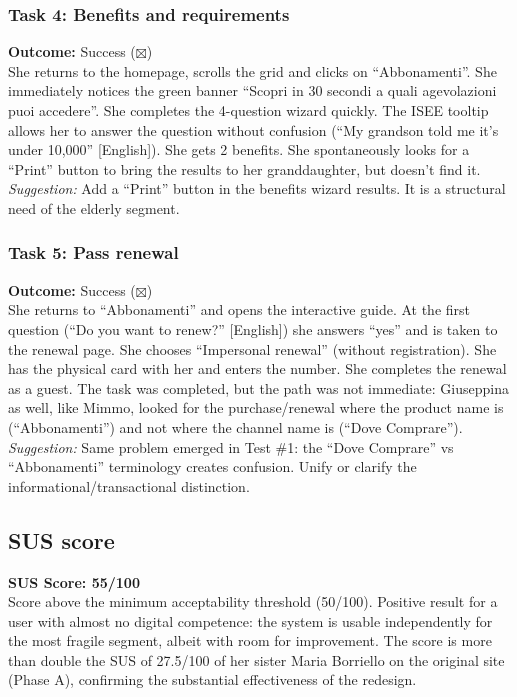 ﻿\documentclass[11pt,a4paper]{article}
\begin{document}
\begin{tcolorbox}[base]
\vspace{0.3cm}

\subsubsection*{Task 4: Benefits and requirements}
\noindent\textbf{Outcome:} Success ($\boxtimes$)\\[0.2cm]
She returns to the homepage, scrolls the grid and clicks on
``Abbonamenti''. She immediately notices the green banner
``Scopri in 30 secondi a quali agevolazioni puoi accedere''.
She completes the 4-question wizard quickly. The ISEE
tooltip allows her to answer the question without
confusion (``My grandson told me it's under 10,000'' [English]).
She gets 2 benefits. She spontaneously looks for a
``Print'' button to bring the results to her granddaughter, but doesn't
find it.\\[0.2cm]
\textit{Suggestion:} Add a ``Print'' button in the
benefits wizard results. It is a structural need
of the elderly segment.

\vspace{0.3cm}

\subsubsection*{Task 5: Pass renewal}
\noindent\textbf{Outcome:} Success ($\boxtimes$)\\[0.2cm]
She returns to ``Abbonamenti'' and opens the interactive guide. At the
first question (``Do you want to renew?'' [English]) she answers ``yes'' and is
taken to the renewal page. She chooses ``Impersonal
renewal'' (without registration). She has the physical card
with her and enters the number. She completes the renewal as a
guest. The task was completed, but the path
was not immediate: Giuseppina as well, like Mimmo,
looked for the purchase/renewal where the product name is
(``Abbonamenti'') and not where the channel name is
(``Dove Comprare'').\\[0.2cm]
\textit{Suggestion:} Same problem emerged in Test \#1:
the ``Dove Comprare'' vs ``Abbonamenti'' terminology creates
confusion. Unify or clarify the informational/transactional
distinction.

\end{tcolorbox}

\subsection*{SUS score}
\begin{tcolorbox}[base]
\textbf{SUS Score: 55/100}\\[0.2cm]
\small Score above the minimum acceptability threshold
(50/100). Positive result for a user
with almost no digital competence: the system is usable
independently for the most fragile segment, albeit with room
for improvement. The score is more than double the
SUS of 27.5/100 of her sister Maria Borriello on the original
site (Phase A), confirming the substantial effectiveness of the
redesign.
\end{tcolorbox}
\end{document}
